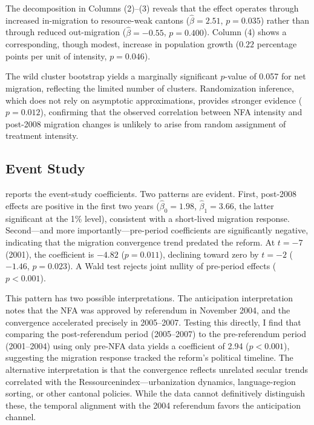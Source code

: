 \documentclass[12pt]{article}
\begin{document}
The decomposition in Columns (2)--(3) reveals that the effect operates through increased in-migration to resource-weak cantons ($\hat{\beta} = 2.51$, $p = 0.035$) rather than through reduced out-migration ($\hat{\beta} = -0.55$, $p = 0.400$). Column (4) shows a corresponding, though modest, increase in population growth ($0.22$ percentage points per unit of intensity, $p = 0.046$).

The wild cluster bootstrap yields a marginally significant $p$-value of 0.057 for net migration, reflecting the limited number of clusters. Randomization inference, which does not rely on asymptotic approximations, provides stronger evidence ($p = 0.012$), confirming that the observed correlation between NFA intensity and post-2008 migration changes is unlikely to arise from random assignment of treatment intensity.

\subsection{Event Study}



 reports the event-study coefficients. Two patterns are evident. First, post-2008 effects are positive in the first two years ($\hat{\beta}_0 = 1.98$, $\hat{\beta}_1 = 3.66$, the latter significant at the 1\% level), consistent with a short-lived migration response. Second---and more importantly---pre-period coefficients are significantly negative, indicating that the migration convergence trend predated the reform. At $t = -7$ (2001), the coefficient is $-4.82$ ($p = 0.011$), declining toward zero by $t = -2$ ($-1.46$, $p = 0.023$). A Wald test rejects joint nullity of pre-period effects ($p < 0.001$).

This pattern has two possible interpretations. The anticipation interpretation notes that the NFA was approved by referendum in November 2004, and the convergence accelerated precisely in 2005--2007. Testing this directly, I find that comparing the post-referendum period (2005--2007) to the pre-referendum period (2001--2004) using only pre-NFA data yields a coefficient of 2.94 ($p < 0.001$), suggesting the migration response tracked the reform's political timeline. The alternative interpretation is that the convergence reflects unrelated secular trends correlated with the Ressourcenindex---urbanization dynamics, language-region sorting, or other cantonal policies. While the data cannot definitively distinguish these, the temporal alignment with the 2004 referendum favors the anticipation channel.
\end{document}
